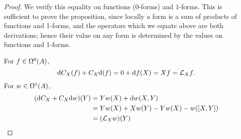 \documentclass[../main]{subfiles}
\begin{document}
\begin{proof}
We verify this equality on functions ($0$-forms) and $1$-forms. This is sufficient to prove the proposition, since locally a form is a sum of products of functions and 1-forms, and the operators which we equate above are both derivations; hence their value on any form is determined by the values on functions and 1-forms.

For $f\in \formbundle{A}{0}$, \[\dd C_{X}(f)+C_{X} \dd(f)=0+\dd f(X)=X f=\liederiv{X} f.\] For $w\in \formbundle{A}{1}$, 
\begin{align*}
    (\dd C_{X}+C_{X} \dd w)(Y)&=Y w(X)+\dd w(X, Y)\\&=Y w(X) + X w(Y)-Y w(X)-w([X, Y])\\&=(\liederiv{X} w)(Y)
\end{align*}

\end{proof}
\end{document}
